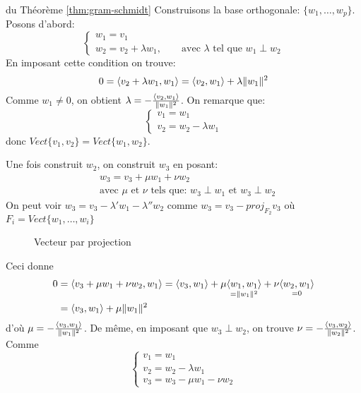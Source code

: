 \begin{preuve} du Théorème \ref{thm:gram-schmidt}
    Construisons la base orthogonale: $\{w_1, \ldots, w_p\}$. Posons d'abord:
    \[
    \begin{cases}
        w_1 = v_1\\
        w_2 = v_2 + \lambda w_1, \qquad \text{avec } \lambda \text{ tel que } w_1 \perp w_2
    \end{cases}
    \] 
    En imposant cette condition on trouve:
    \[
        0 = \langle v_2 + \lambda w_1, w_1 \rangle = \langle v_2, w_1 \rangle + \lambda \|w_1\|^2
    \] 
    Comme $w_1 \neq 0$, on obtient $\lambda = - \frac{\langle v_2, w_1 \rangle}{\|w_1\|^2}$. On remarque que:
    \[
    \begin{cases}
        v_1 = w_1\\
        v_2 = w_2 - \lambda w_1
    \end{cases}
    \] 
    donc $Vect\{v_1, v_2\} = Vect\{w_1, w_2\}$.
    \par
    Une fois construit $w_2$, on construit $w_3$ en posant:
    \begin{align*}
        &w_3 = v_3 + \mu w_1 + \nu w_2\\
        &\text{avec } \mu \text{ et } \nu \text{ tels que: } w_3 \perp w_1 \text{ et } w_3 \perp w_2
    \end{align*}
    On peut voir $w_3 = v_3 - \lambda' w_1 - \lambda'' w_2 $ comme $w_3 = v_3 - proj_{F_2}v_3$ où $F_i = Vect\{w_1, \ldots, w_i\}$
    \begin{figure}[H]
        \centering
        \caption{Vecteur par projection}
        \label{fig:projection-with-bon-thm}
    \end{figure}
    Ceci donne
    \begin{align*}
        0 &= \langle v_3 + \mu w_1 + \nu w_2, w_1 \rangle = \langle v_3, w_1 \rangle + \mu \underset{= \|w_1\|^2}{\langle w_1, w_1 \rangle} + \nu \underset{= 0}{\langle w_2, w_1 \rangle}\\
          &= \langle v_3, w_1 \rangle + \mu \|w_1\|^2 
    \end{align*}
    d'où $\mu = - \frac{\langle v_3, w_1 \rangle}{\|w_1\|^2}$. De même, en imposant que $w_3 \perp w_2$, on trouve $\nu = - \frac{\langle v_3, w_2 \rangle}{\|w_2\|^2}$. Comme
    \[
    \begin{cases}
        v_1 = w_1\\
        v_2 = w_2 - \lambda w_1\\
        v_3 = w_3 - \mu w_1 - \nu w_2
    \end{cases}
\]
\end{preuve}

